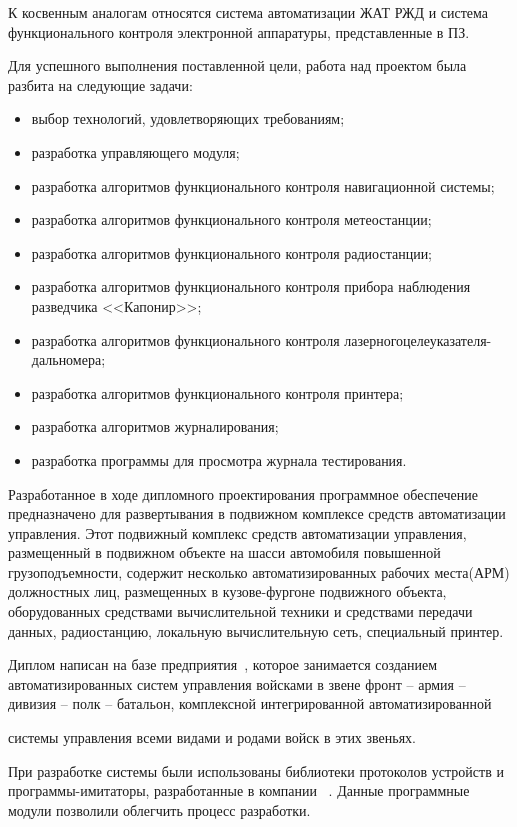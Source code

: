 К косвенным аналогам относятся система автоматизации ЖАТ РЖД и система функционального контроля электронной аппаратуры,
представленные в ПЗ.

Для успешного выполнения поставленной цели, работа над проектом была разбита на следующие задачи:
\begin{itemize}
    \item выбор технологий, удовлетворяющих требованиям;
    \item разработка управляющего модуля;
    \item разработка алгоритмов функционального контроля навигационной системы;
    \item разработка алгоритмов функционального контроля метеостанции;
    \item разработка алгоритмов функционального контроля радиостанции;
    \item разработка алгоритмов функционального контроля прибора наблюдения разведчика <<Капонир>>;
    \item разработка алгоритмов функционального контроля лазерного\break целеуказателя-дальномера;
    \item разработка алгоритмов функционального контроля принтера;
    \item разработка алгоритмов журналирования;
    \item разработка программы для просмотра журнала тестирования.
\end{itemize}

Разработанное в ходе дипломного проектирования программное обеспечение предназначено для развертывания в подвижном
комплексе средств автоматизации управления.
Этот подвижный комплекс средств автоматизации управления, размещенный в подвижном объекте на шасси автомобиля повышенной
грузоподъемности, содержит несколько автоматизированных рабочих места(АРМ) должностных лиц, размещенных в кузове-фургоне
подвижного объекта, оборудованных средствами вычислительной техники и средствами передачи данных,
радиостанцию, локальную вычислительную
сеть, специальный принтер.

Диплом написан на базе предприятия~\company, которое занимается созданием автоматизированных систем
управления войсками в звене фронт -- армия -- дивизия -- полк -- батальон, комплексной интегрированной автоматизированной

системы управления всеми видами и родами войск в этих звеньях.

При разработке системы были использованы библиотеки протоколов устройств и программы-имитаторы, разработанные в компании
~\company. Данные программные модули позволили облегчить процесс разработки.

